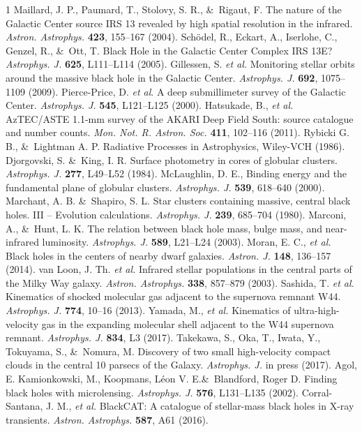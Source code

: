 \documentclass{nature}
\begin{document}
\begin{thebibliography}{1}
 Maillard, J. P., Paumard, T., Stolovy, S. R., \&\ Rigaut, F. The nature of the Galactic Center source IRS 13 revealed by high spatial resolution in the infrared. {\it Astron. Astrophys.} {\bf 423}, 155--167 (2004).
 Sch\"odel, R., Eckart, A., Iserlohe, C., Genzel, R., \&\ Ott, T.  Black Hole in the Galactic Center Complex IRS 13E? {\it Astrophys. J.} {\bf 625}, L111--L114 (2005).
 Gillessen, S. {\it et al.} Monitoring stellar orbits around the massive black hole in the Galactic Center. {\it Astrophys. J.} {\bf 692}, 1075--1109 (2009).
 Pierce-Price, D. {\it et al}. A deep submillimeter survey of the Galactic Center. {\it Astrophys. J.} {\bf 545}, L121--L125 (2000).
 Hatsukade, B., {\it et al.} AzTEC/ASTE 1.1-mm survey of the AKARI Deep Field South: source catalogue and number counts. {\it Mon. Not. R. Astron. Soc.} {\bf 411}, 102--116 (2011).
 Rybicki G. B., \&\ Lightman A. P. Radiative Processes in Astrophysics, Wiley-VCH  (1986).
 Djorgovski, S. \&\ King, I. R. Surface photometry in cores of globular clusters. {\it Astrophys. J.} {\bf 277}, L49--L52 (1984).
 McLaughlin, D. E., Binding energy and the fundamental plane of globular clusters. {\it Astrophys. J.} {\bf 539}, 618--640 (2000).
 Marchant, A. B. \&\ Shapiro, S. L. Star clusters containing massive, central black holes. III -- Evolution calculations. {\it Astrophys. J.} {\bf 239}, 685--704 (1980).
 Marconi, A., \&\ Hunt, L. K. The relation between black hole mass, bulge mass, and near-infrared luminosity. {\it Astrophys. J.} {\bf589}, L21--L24 (2003).
 Moran, E. C., {\it et al.} Black holes in the centers of nearby dwarf galaxies. {\it Astron. J.} {\bf 148}, 136--157 (2014).
 van Loon, J. Th. {\it et al.} Infrared stellar populations in the central parts of the Milky Way galaxy. {\it Astron. Astrophys.} {\bf 338}, 857--879 (2003).
 Sashida, T. {\it et al.} Kinematics of shocked molecular gas adjacent to the supernova remnant W44. {\it Astrophys. J.} {\bf 774}, 10--16 (2013).
 Yamada, M., {\it et al.} Kinematics of ultra-high-velocity gas in the expanding molecular shell adjacent to the W44 supernova remnant. {\it Astrophys. J.} {\bf 834}, L3 (2017).
 Takekawa, S., Oka, T., Iwata, Y., Tokuyama, S., \&\ Nomura, M. Discovery of two small high-velocity compact clouds in the central 10 parsecs of the Galaxy. {\it Astrophys. J.}  in press (2017). 
 Agol, E. Kamionkowski, M., Koopmans, L\'eon V. E.\&\ Blandford, Roger D. Finding black holes with microlensing. {\it Astrophys. J.} {\bf 576}, L131--L135 (2002). 
 Corral-Santana, J. M., {\it et al.} BlackCAT: A catalogue of stellar-mass black holes in X-ray transients. {\it Astron. Astrophys.} {\bf 587}, A61 (2016).
\end{thebibliography}
\end{document}
